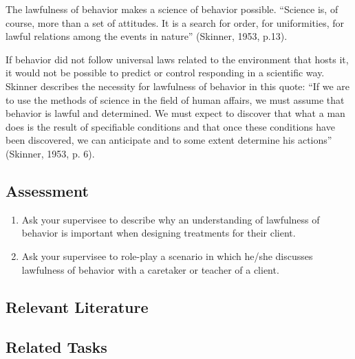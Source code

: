 The lawfulness of behavior makes a science of behavior possible. ``Science is, of course, more than a set of attitudes. It is a search for order, for uniformities, for lawful relations among the events in nature'' (Skinner, 1953, p.13).

If behavior did not follow universal laws related to the environment that hosts it, it would not be possible to predict or control responding in a scientific way. Skinner describes the necessity for lawfulness of behavior in this quote: ``If we are to use the methods of science in the field of human affairs, we must assume that behavior is lawful and determined. We must expect to discover that what a man does is the result of specifiable conditions and that once these conditions have been discovered, we can anticipate and to some extent determine his actions'' (Skinner, 1953, p. 6).
%
%
%
\subsection{Assessment}
\begin{enumerate}
\item Ask your supervisee to describe why an understanding of lawfulness of behavior is important when designing treatments for their client.
\item Ask your supervisee to role-play a scenario in which he/she discusses lawfulness of behavior with a caretaker or teacher of a client.
%
\end{enumerate}
%
\subsection{Relevant Literature}
\begin{refsection}
\nocite{test,alang2017police,clayton2018black}
\printbibliography[heading=none]
\end{refsection}
%
\subsection{Related Tasks}
\fourbThree{}\\
\fourFKTwo{}\\
\fourFKThree{}\\
\fourFKFour{}\\
\fourFKFive{}\\
\fourFKSix{}\\
%
%
%
%
%
%
%
%
